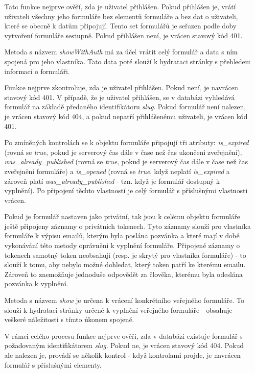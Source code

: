 			Tato funkce nejprve ověří, zda je uživatel přihlášen. Pokud přihlášen je, vrátí uživateli všechny jeho formuláře bez elementů formuláře a bez dat o uživateli, které se obecně k datům připojují. Tento set formulářů je seřazen podle doby vytvoření formuláře sestupně. Pokud přihlášen není, je vrácen stavový kód 401. 
			
			Metoda s názvem \textit{showWithAuth} má za účel vrátit celý formulář a data s ním spojená pro jeho vlastníka. Tato data poté slouží k hydrataci stránky s přehledem informací o formuláři.
			
			Funkce nejprve zkontroluje, zda je uživatel přihlášen. Pokud není, je navrácen stavový kód 401. V případě, že je uživatel přihlášen, se v databázi vyhledává formulář na základě předaného identifikátoru \textit{slug}. Pokud formulář není nalezen, je vrácen stavový kód 404, a pokud nepatří přihlášenému uživateli, je vrácen kód 401. 
			
			Po zmíněných kontrolách se k objektu formuláře připojují tři atributy: \textit{is\_expired} (rovná se \textit{true}, pokud je serverový čas dále v čase než čas ukončení zveřejnění), \textit{was\_already\_published} (rovná se \textit{true}, pokud je serverový čas dále v čase než čas zveřejnění formuláře) a \textit{is\_opened} (rovná se \textit{true}, když neplatí \textit{is\_expired} a zároveň platí \textit{was\_already\_published} - tzn. když je formulář dostupný k vyplnění). Po připojení těchto vlastností je celý formulář s příslušnými vlastnosti vrácen.
			
			Pokud je formulář nastaven jako privátní, tak jsou k celému objektu formuláře ještě připojeny záznamy o privátních tokenech. Tyto záznamy slouží pro vlastníka formuláře k výpisu emailů, kterým byla poslána pozvánka a které mají v době vykonávání této metody oprávnění k vyplnění formuláře. Připojené záznamy o tokenech samotný token neobsahují (resp. je skrytý pro vlastníka formuláře) - to slouží k tomu, aby nebylo možné dohledat, který token patří ke kterému emailu. Zároveň to znemožňuje jednoduše odpovědět za člověka, kterému byla odeslána pozvánka k vyplnění.
			
			\label{sec:form_show}
			Metoda s názvem \textit{show} je určena k vrácení konkrétního veřejného formuláře. To slouží k hydrataci stránky určené k vyplnění veřejného formuláře - obsahuje veškeré náležitosti s tímto úkonem spojené.
			
			V rámci celého procesu funkce nejprve ověří, zda v databázi existuje formulář s požadovaným identifikátorem \textit{slug}. Pokud ne, je vrácen stavový kód 404. Pokud ale nalezen je, provádí se několik kontrol - když kontrolami projde, je navrácen formulář s příslušnými elementy.
			
